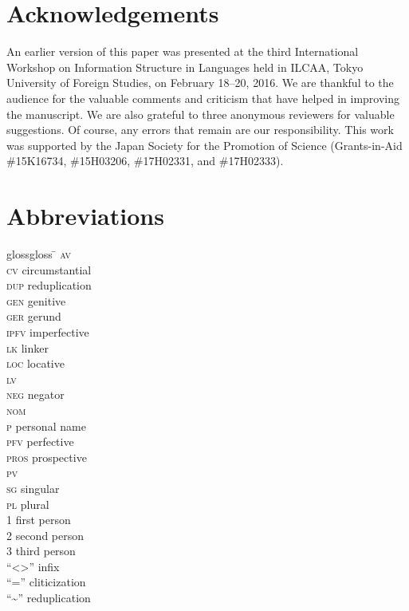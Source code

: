 \documentclass[output=paper]{langsci/langscibook}
\begin{document}
\section*{Acknowledgements}

An earlier version of this paper was presented at the third International Workshop on Information Structure in  Languages held in ILCAA, Tokyo University of Foreign Studies, on February 18--20, 2016. We are thankful to the audience for the valuable comments and criticism that have helped in improving the manuscript. We are also grateful to three anonymous reviewers for valuable suggestions. Of course, any errors that remain are our responsibility. This work was supported by the Japan Society for the Promotion of Science (Grants-in-Aid \#15K16734, \#15H03206, \#17H02331, and \#17H02333).

\section*{Abbreviations}

\begin{multicols}{2}
	\begin{tabbing}
		glossgloss \= \kill
		\textsc{av} \> \\
		\textsc{cv} \> circumstantial \\
		\textsc{dup} \> reduplication\\
		\textsc{gen} \> genitive\\
		\textsc{ger} \> gerund\\
		\textsc{ipfv} \> imperfective\\
		\textsc{lk} \> linker\\
		\textsc{loc} \> locative\\
		\textsc{lv} \> \\
		\textsc{neg} \> negator\\
		\textsc{nom} \> \\
		\textsc{p} \> personal name\\
		\textsc{pfv} \> perfective\\
		\textsc{pros} \> prospective\\
		\textsc{pv} \> \\
		\textsc{sg} \> singular\\
		\textsc{pl} \> plural\\
		1 \> first person\\
		2 \> second person\\
		3 \> third person\\
		“<>” \> infix\\
		“=” \> cliticization\\
		“{\textasciitilde}” \> reduplication
	\end{tabbing}
\end{multicols}
\end{document}
